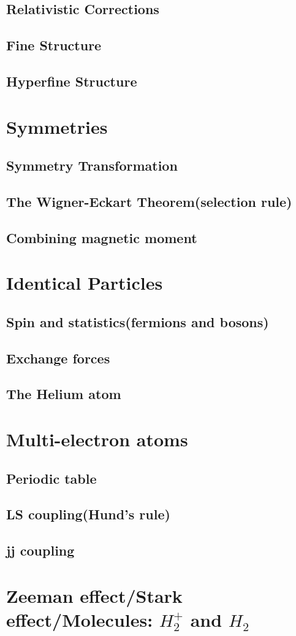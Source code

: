\documentclass[12pt,a4paper]{article}
\begin{document}
\subsection{Relativistic Corrections}
\subsection{Fine Structure}
\subsection{Hyperfine Structure}
\section{Symmetries}

\subsection{Symmetry Transformation}
\subsection{The Wigner-Eckart Theorem(selection rule)}
\subsection{Combining magnetic moment}
\section{Identical Particles}
\subsection{Spin and statistics(fermions and bosons)}
\subsection{Exchange forces}
\subsection{The Helium atom}
\section{Multi-electron atoms}
\subsection{Periodic table}
\subsection{LS coupling(Hund's rule)}
\subsection{jj coupling}
\section{Zeeman effect/Stark effect/Molecules: $H^+_2$ and $H_2$}
\end{document}
